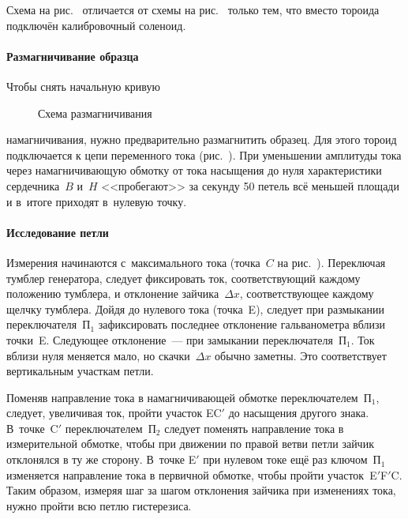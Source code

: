 Схема на рис.~ отличается от схемы на
рис.~ только тем, что вместо тороида
подключён калибровочный соленоид.

%



\paragraph{Размагничивание образца}
Чтобы снять начальную кривую 
\begin{wrapfigure}[8]{r}{0.5\textwidth}
    \centering
    \caption{Схема размагничивания}
\end{wrapfigure}
намагничивания, нужно предварительно 
размагнитить образец.
Для этого тороид подключается к цепи переменного тока
(рис.~). При уменьшении амплитуды тока через
намагничивающую обмотку от тока насыщения до нуля характеристики сердечника~$B$
и~$H$ <<пробегают>> за секунду 50 петель всё меньшей площади и в~итоге
приходят в~нулевую точку.



\paragraph{Исследование петли}
Измерения начинаются с~максимального тока (точка~$C$ на рис.~). Переключая тумблер генератора,
следует фиксировать ток, соответствующий каждому положению тумблера, и
отклонение зайчика~$\Delta x$, соответствующее
каждому щелчку тумблера. Дойдя до нулевого тока
(точка~E), следует при размыкании переключателя~$\text{П}_1$ 
зафиксировать последнее отклонение гальванометра вблизи точки~E. Следующее
отклонение~--- при замыкании переключателя~$\text{П}_1$. 
Ток вблизи нуля меняется мало, но скачки~$\Delta x$ обычно заметны. 
Это соответствует вертикальным участкам петли.

Поменяв направление тока в намагничивающей обмотке переключателем~$\text{П}_1$,
следует, увеличивая ток, пройти участок EC$'$ до
насыщения другого знака. В~точке~C$'$ переключателем~$\text{П}_2$ следует
поменять направление тока в измерительной обмотке, чтобы при
движении по правой ветви петли зайчик отклонялся в ту же сторону. 
В~точке E$'$ при нулевом токе ещё раз ключом~$\text{П}_1$
изменяется направление тока в первичной обмотке, чтобы пройти участок~E$'$F$'$C.
Таким образом, измеряя шаг за шагом отклонения зайчика при изменениях тока, 
нужно пройти всю петлю гистерезиса.

